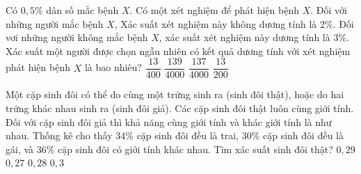 \begin{ex}%
Có $0{,}5\%$ dân số mắc bệnh $X$. Có một xét nghiệm để phát hiện bệnh $X$. Đối với những người mắc bệnh $X$, Xác suất xét nghiệm này không dương tính là $2\%$. Đối vơi những người không mắc bệnh $X$, xác suất xét nghiệm này dương tính là $3\%$. Xác suất một người được chọn ngẫu nhiên có kết quả dương tính với xét nghiệm phát hiện bệnh $X$ là bao nhiêu?
	\choice
	{$\dfrac{13}{400}$}
	{\True $\dfrac{139}{4000}$}
	{$\dfrac{137}{4000}$}
	{$\dfrac{13}{200}$}
\end{ex}
\begin{ex}%
Một cặp sinh đôi có thể do cùng một trứng sinh ra (sinh đôi thật), hoặc do hai trứng
khác nhau sinh ra (sinh đôi giả). Các cặp sinh đôi thật luôn cùng giới tính. Đối với
cặp sinh đôi giả thì khả năng cùng giới tính và khác giới tính là như nhau. Thống kê
cho thấy $34\%$ cặp sinh đôi đều là trai, $30\%$ cặp sinh đôi đều là gái, và $36\%$ cặp sinh đôi có giới tính khác nhau. Tìm xác suất sinh đôi thật?
	\choice
	{$0{,}29$}
	{$0{,}27$}
	{\True$0{,}28$}
	{$0{,}3$}
\end{ex}
